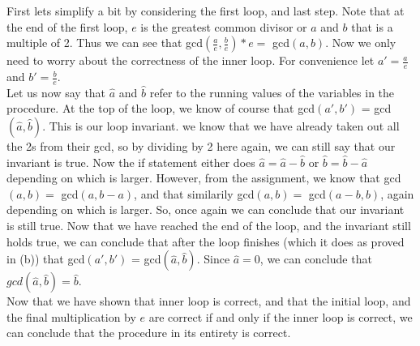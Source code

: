 \documentclass[12pt]{article}
\begin{document}
\begin{list}{.}{}
\begin{list}{)}{}
\item First lets simplify a bit by considering the first loop, and last step.
Note that at the end of the first loop, $e$ is the greatest common divisor or
$a$ and $b$ that is a multiple of 2.  Thus we can see that
gcd$(\frac{a}{e},\frac{b}{e}) * e = $ gcd$(a,b)$.  Now we only need to worry
about the correctness of the inner loop.  For convenience let $a' = \frac{a}{e}$
and $b' = \frac{b}{e}$.\\
Let us now say that $\hat a$ and $\hat b$ refer to the running values of the
variables in the procedure.  At the top of the loop, we know of course that
gcd$(a',b')$ = gcd$(\hat a,\hat b)$.  This is our loop invariant.
we know that we have already taken out all the 2s from their gcd, so by dividing
by 2 here again, we can still say that our invariant is true.  Now the if
statement either does $\hat a = \hat a - \hat b$ or $\hat b = \hat b - \hat a$
depending on which is larger.  However, from the assignment, we know that
gcd$(a,b) = $ gcd$(a, b-a)$, and that similarily gcd$(a,b) = $ gcd$(a-b,b)$,
again depending on which is larger.  So, once again we can conclude that our
invariant is still true.  Now that we have reached the end of the loop, and the
invariant still holds true, we can conclude that after the loop finishes (which
it does as proved in (b)) that gcd$(a',b')$ = gcd$(\hat a,\hat b)$.  Since $\hat
a = 0$, we can conclude that $gcd(\hat a, \hat b) = \hat b$.\\
Now that we have shown that inner loop is correct, and that the initial loop,
and the final multiplication by $e$ are correct if and only if the inner loop is
correct, we can conclude that the procedure in its entirety is correct.

\end{list}

\end{list}
\end{document}
